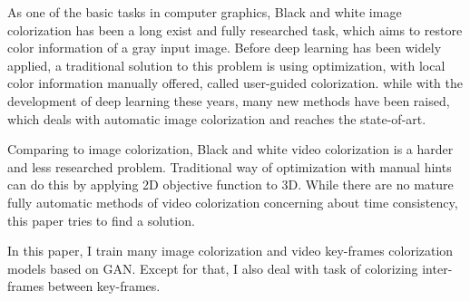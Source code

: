 
\begin{eabstract}
   As one of the basic tasks in computer graphics, Black and white image colorization has been a long exist and fully researched task, which aims to restore color information of a gray input image. Before deep learning has been widely applied, a traditional solution to this problem is using optimization, with local color information manually offered, called user-guided colorization. while with the development of deep learning these years, many new methods have been raised, which deals with automatic image colorization and reaches the state-of-art.

   Comparing to image colorization, Black and white video colorization is a harder and less researched problem. Traditional way of optimization with manual hints can do this by applying 2D objective function to 3D. While there are no mature fully automatic methods of video colorization concerning about time consistency, this paper tries to find a solution.

   In this paper, I train many image colorization and video key-frames colorization models based on GAN. Except for that, I also deal with task of colorizing inter-frames between key-frames.

\end{eabstract}

